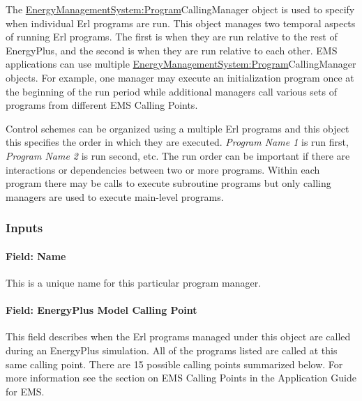 The \hyperref[energymanagementsystemprogram]{EnergyManagementSystem:Program}CallingManager object is used to specify when individual Erl programs are run. This object manages two temporal aspects of running Erl programs. The first is when they are run relative to the rest of EnergyPlus, and the second is when they are run relative to each other. EMS applications can use multiple \hyperref[energymanagementsystemprogram]{EnergyManagementSystem:Program}CallingManager objects. For example, one manager may execute an initialization program once at the beginning of the run period while additional managers call various sets of programs from different EMS Calling Points.

Control schemes can be organized using a multiple Erl programs and this object this specifies the order in which they are executed. \emph{Program Name 1} is run first, \emph{Program Name 2} is run second, etc. The run order can be important if there are interactions or dependencies between two or more programs. Within each program there may be calls to execute subroutine programs but only calling managers are used to execute main-level programs.

\subsubsection{Inputs}\label{inputs-2-012}

\paragraph{Field: Name}\label{field-name-2-011}

This is a unique name for this particular program manager.

\paragraph{Field: EnergyPlus Model Calling Point}\label{field-energyplus-model-calling-point}

This field describes when the Erl programs managed under this object are called during an EnergyPlus simulation. All of the programs listed are called at this same calling point. There are 15 possible calling points summarized below. For more information see the section on EMS Calling Points in the Application Guide for EMS.

